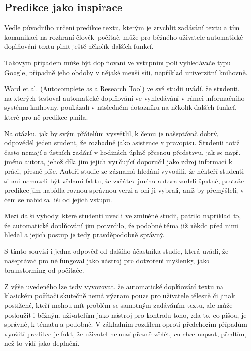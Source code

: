 \documentclass[a4paper,11pt]{article}
\newcommand{\td}[2][]{
	{\todo[size=\footnotesize]{#2}}
}
\begin{document}
\subsection{Predikce jako inspirace}\td{isnt that too… poetic, if I may? (ten nadpis myslím) xD}

Vedle původního určení predikce textu, kterým je zrychlit zadávání textu a tím komunikaci na rozhraní člověk--počítač, může pro běžného uživatele automatické doplňování textu plnit ještě několik dalších funkcí.

Takovým případem může být doplňování ve vstupním poli vyhledávače typu Google, případně jeho obdoby v nějaké menší síti, například univerzitní knihovně.

Ward et al. (Autocomplete as a Research Tool) ve své studii uvádí, že studenti, na kterých testoval automatické doplňování ve vyhledávání v rámci informačního systému knihovny, poukázali v následném dotazníku na několik dalších funkcí, které pro ně predikce plnila. 

Na otázku, jak by svým přátelům vysvětlil, k čemu je našeptávač dobrý, odpověděl jeden student, že rozhodně jako asistence v pravopisu. Studenti totiž často nemají z ústních zadání v hodinách úplně přesnou představu, jak se např. jméno autora, jehož díla jim jejich vyučující doporučil jako zdroj informací k práci, přesně píše. Autoři studie ze záznamů hledání vyvodili, že někteří studenti si ani nemuseli být vědomi faktu, že začátek jména autora zadali špatně, protože predikce jim nabídla rovnou správnou verzi a oni ji vybrali, aniž by přemýšleli, v čem se nabídka liší od jejich vstupu. 

Mezi další výhody, které studenti uvedli ve zmíněné studii, patřilo například to, že automatické doplňování jim potvrdilo, že podobné téma již někdo před nimi hledal a jejich postup je tedy pravděpodobně správný. 

S tímto souvisí i jedna odpověď od dalšího účastníka studie, která uvádí, že našeptávač pro ně fungoval jako nástroj pro dotvoření myšlenky, jako brainstorming od počítače. 

Z výše uvedeného lze tedy vyvozovat, že automatické doplňování textu na klasickém počítači skutečně nemá význam pouze pro uživatele tělesně či jinak postižené, kteří mohou mít problém se samotným zadáváním textu, ale může posloužit i běžným uživatelům jako nástroj pro kontrolu toho, zda to, co píšou, je správně, k tématu a podobně. V základním rozdílem oproti předchozím případům využití predikce je fakt, že uživatel nemusí přesně vědět, co chce napsat, předtím, než to vidí jako doplnění.
\end{document}
